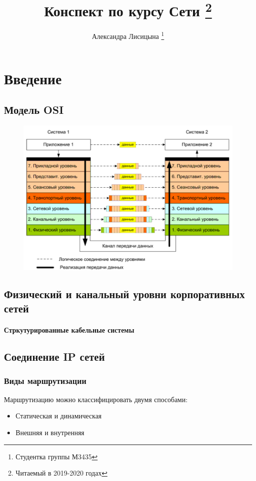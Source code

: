 \documentclass[10pt,a4paper,oneside,titlepage]{report}
\title{Конспект по курсу Сети \thanks{Читаемый  в 2019-2020 годах}}
\author{Александра Лисицына \thanks{Студентка группы М3435}}
\theoremstyle{defenition}
\begin{document}
	
\maketitle

\tableofcontents

\clearpage	

\chapter{Введение}

\section{Модель OSI}

\begin{figure}[h!]
	\centering
	\includegraphics[width=0.4\linewidth]{pictures/ModelOSI}
	\caption[Модель OSI]{}
	\label{fig:modelosi}
\end{figure}


\section{Физический и канальный уровни корпоративных сетей}

\subsubsection{Стркутурированные кабельные системы} %

\section{Соединение IP сетей}

\subsection{Виды маршрутизации}

Маршрутизацию можно классифицировать двумя способами:
\begin{itemize}
	\item Статическая и динамическая
	\item Внешняя и внутренняя
\end{itemize}
\end{document}

